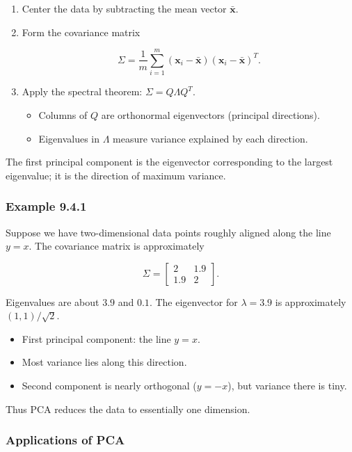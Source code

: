 \documentclass[
  12pt,
  a4paper,
]{article}
\begin{document}
\begin{enumerate}
\def\labelenumi{\arabic{enumi}.}
\item
  Center the data by subtracting the mean vector \(\bar{\mathbf{x}}\).
\item
  Form the covariance matrix

  \[\Sigma = \frac{1}{m} \sum_{i=1}^m (\mathbf{x}_i - \bar{\mathbf{x}})(\mathbf{x}_i - \bar{\mathbf{x}})^T.\]
\item
  Apply the spectral theorem: \(\Sigma = Q \Lambda Q^T\).

  \begin{itemize}
  \item
    Columns of \(Q\) are orthonormal eigenvectors (principal
    directions).
  \item
    Eigenvalues in \(\Lambda\) measure variance explained by each
    direction.
  \end{itemize}
\end{enumerate}

The first principal component is the eigenvector corresponding to the
largest eigenvalue; it is the direction of maximum variance.

\subsubsection{Example 9.4.1}\label{example-941}

Suppose we have two-dimensional data points roughly aligned along the
line \(y = x\). The covariance matrix is approximately

\[\Sigma = \begin{bmatrix} 2 & 1.9 \\ 1.9 & 2 \end{bmatrix}.\]

Eigenvalues are about \(3.9\) and \(0.1\). The eigenvector for
\(\lambda = 3.9\) is approximately \((1,1)/\sqrt{2}\).

\begin{itemize}
\item
  First principal component: the line \(y = x\).
\item
  Most variance lies along this direction.
\item
  Second component is nearly orthogonal (\(y = -x\)), but variance there
  is tiny.
\end{itemize}

Thus PCA reduces the data to essentially one dimension.

\subsubsection{Applications of PCA}\label{applications-of-pca}
\end{document}
